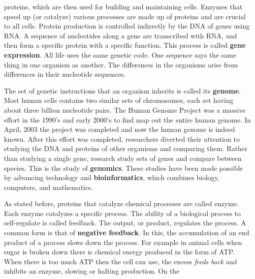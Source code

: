 \documentclass[crop=false,class=book,oneside]{standalone}
\begin{document}
        proteins, which are then used for building and
        maintaining cells. Enzymes that speed up
        (or catalyze) various processes are made up
        of proteins and are crucial to all cells. Protein
        production is controlled indirectly by the DNA
        of genes using RNA. A sequence of nucleotides
        along a gene are transcribed with RNA, and then form
        a specific protein with a specific function. This
        process is called
        \textbf{gene expression}. All life uses the same
        genetic code. One sequence says the same thing in
        one organism as another. The differences in the
        organisms arise from differences in their
        nucleotide sequences.
        \par\hfill\par
        The set of genetic instructions that an
        organism inherits is called its \textbf{genome}.
        Most human cells contains two similar sets of
        chromosomes, each set having about
        three billion nucleotide pairs. The Human Genome
        Project was a massive effort in the 1990's
        and early 2000's to find map out the entire
        human genome. In April, 2003 the project was
        completed and now the human genome is indeed
        known. After this effort was completed,
        researchers diverted their attention to
        studying the DNA and proteins of other organisms
        and comparing them. Rather than studying a
        single gene, research study sets of genes and
        compare between species. This is the study
        of \textbf{genomics}. These studies have been made
        possible by advancing technology and
        \textbf{bioinformatics}, which combines biology,
        computers, and mathematics.
        \par\hfill\par
        As stated before, proteins that catalyze chemical
        processes are called enzyme. Each enzyme
        catalyzes a specific process. The ability of a
        biological process to self-regulate is called
        feedback. The output, or product, regulates the
        process. A common form is that of
        \textbf{negative feedback}. In this, the
        accumulation of an end product of a process
        slows down the process. For example in animal
        cells when sugar is broken down there is
        chemical energy produced in the form of ATP. When
        there is too much ATP then the cell can use,
        the excess \textit{feeds back} and inhibits
        an enzyme, slowing or halting production. On the
\end{document}
